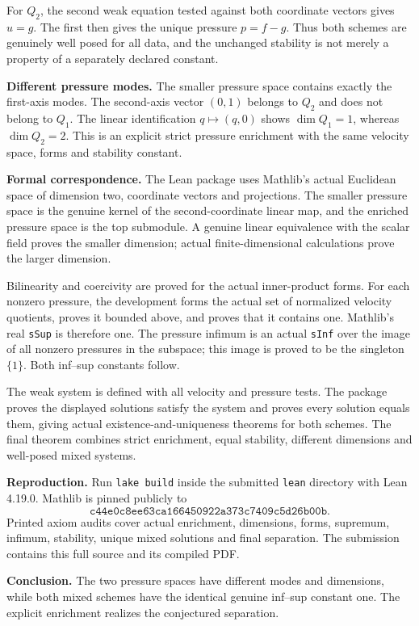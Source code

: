 \documentclass[11pt]{article}
\begin{document}
For $Q_2$, the second weak equation tested against both coordinate vectors gives $u=g$. The first then gives the unique pressure $p=f-g$. Thus both schemes are genuinely well posed for all data, and the unchanged stability is not merely a property of a separately declared constant.

\textbf{Different pressure modes.}
The smaller pressure space contains exactly the first-axis modes. The second-axis vector $(0,1)$ belongs to $Q_2$ and does not belong to $Q_1$. The linear identification $q\mapsto(q,0)$ shows $\dim Q_1=1$, whereas $\dim Q_2=2$. This is an explicit strict pressure enrichment with the same velocity space, forms and stability constant.

\textbf{Formal correspondence.}
The Lean package uses Mathlib's actual Euclidean space of dimension two, coordinate vectors and projections. The smaller pressure space is the genuine kernel of the second-coordinate linear map, and the enriched pressure space is the top submodule. A genuine linear equivalence with the scalar field proves the smaller dimension; actual finite-dimensional calculations prove the larger dimension.

Bilinearity and coercivity are proved for the actual inner-product forms. For each nonzero pressure, the development forms the actual set of normalized velocity quotients, proves it bounded above, and proves that it contains one. Mathlib's real \texttt{sSup} is therefore one. The pressure infimum is an actual \texttt{sInf} over the image of all nonzero pressures in the subspace; this image is proved to be the singleton $\{1\}$. Both inf--sup constants follow.

The weak system is defined with all velocity and pressure tests. The package proves the displayed solutions satisfy the system and proves every solution equals them, giving actual existence-and-uniqueness theorems for both schemes. The final theorem combines strict enrichment, equal stability, different dimensions and well-posed mixed systems.

\textbf{Reproduction.}
Run \texttt{lake build} inside the submitted \texttt{lean} directory with Lean 4.19.0. Mathlib is pinned publicly to
\[
 \texttt{c44e0c8ee63ca166450922a373c7409c5d26b00b}.
\]
Printed axiom audits cover actual enrichment, dimensions, forms, supremum, infimum, stability, unique mixed solutions and final separation. The submission contains this full source and its compiled PDF.

\textbf{Conclusion.}
The two pressure spaces have different modes and dimensions, while both mixed schemes have the identical genuine inf--sup constant one. The explicit enrichment realizes the conjectured separation.
\end{document}

